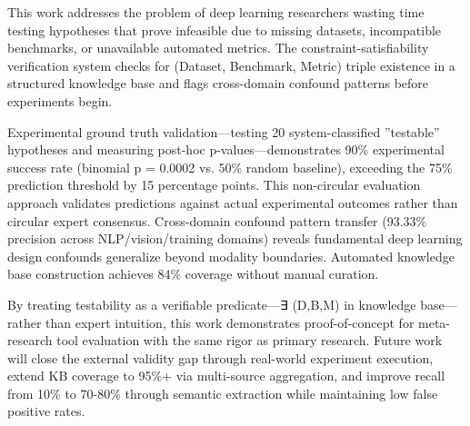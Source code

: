 
This work addresses the problem of deep learning researchers wasting time testing hypotheses that prove infeasible due to missing datasets, incompatible benchmarks, or unavailable automated metrics. The constraint-satisfiability verification system checks for (Dataset, Benchmark, Metric) triple existence in a structured knowledge base and flags cross-domain confound patterns before experiments begin.

Experimental ground truth validation---testing 20 system-classified ''testable'' hypotheses and measuring post-hoc p-values---demonstrates 90\% experimental success rate (binomial p = 0.0002 vs. 50\% random baseline), exceeding the 75\% prediction threshold by 15 percentage points. This non-circular evaluation approach validates predictions against actual experimental outcomes rather than circular expert consensus. Cross-domain confound pattern transfer (93.33\% precision across NLP/vision/training domains) reveals fundamental deep learning design confounds generalize beyond modality boundaries. Automated knowledge base construction achieves 84\% coverage without manual curation.

By treating testability as a verifiable predicate---∃ (D,B,M) in knowledge base---rather than expert intuition, this work demonstrates proof-of-concept for meta-research tool evaluation with the same rigor as primary research. Future work will close the external validity gap through real-world experiment execution, extend KB coverage to 95\%+ via multi-source aggregation, and improve recall from 10\% to 70-80\% through semantic extraction while maintaining low false positive rates.
